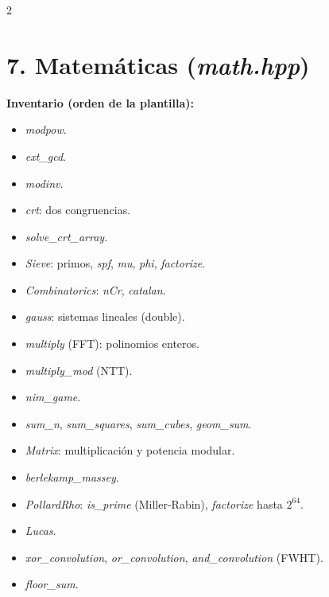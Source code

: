 \documentclass[10pt]{article}
\begin{document}
\begin{multicols}{2}
\section*{7. Matemáticas (\textit{math.hpp})}

\textbf{Inventario (orden de la plantilla):}
\begin{itemize}\setlength{\itemsep}{1pt}
  \item \textit{modpow}.
  \item \textit{ext\_gcd}.
  \item \textit{modinv}.
  \item \textit{crt}: dos congruencias.
  \item \textit{solve\_crt\_array}.
  \item \textit{Sieve}: primos, \textit{spf}, \textit{mu}, \textit{phi}, \textit{factorize}.
  \item \textit{Combinatorics}: \textit{nCr}, \textit{catalan}.
  \item \textit{gauss}: sistemas lineales (double).
  \item \textit{multiply} (FFT): polinomios enteros.
  \item \textit{multiply\_mod} (NTT).
  \item \textit{nim\_game}.
  \item \textit{sum\_n}, \textit{sum\_squares}, \textit{sum\_cubes}, \textit{geom\_sum}.
  \item \textit{Matrix}: multiplicación y potencia modular.
  \item \textit{berlekamp\_massey}.
  \item \textit{PollardRho}: \textit{is\_prime} (Miller-Rabin), \textit{factorize} hasta $2^{64}$.
  \item \textit{Lucas}.
  \item \textit{xor\_convolution}, \textit{or\_convolution}, \textit{and\_convolution} (FWHT).
  \item \textit{floor\_sum}.
\end{itemize}


\end{multicols}
\end{document}
